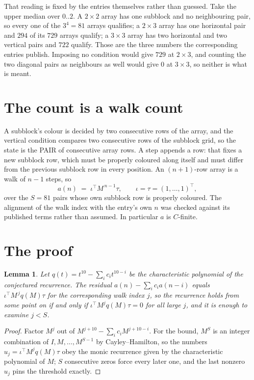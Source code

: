 \documentclass[11pt,a4paper]{article}
\theoremstyle{plain}
\newtheorem{lemma}[theorem]{Lemma}
\theoremstyle{definition}
\begin{document}
That reading is fixed by the entries themselves rather than guessed. Take the upper median
over $0..2$. A $2\times2$ array has one subblock and no neighbouring pair, so every one of the
$3^4=81$ arrays qualifies; a $2\times3$ array has one horizontal pair and $294$ of its $729$
arrays qualify; a $3\times3$ array has two horizontal and two vertical pairs and $722$
qualify. Those are the three numbers the corresponding entries publish. Imposing no condition
would give $729$ at $2\times3$, and counting the two diagonal pairs as neighbours as well
would give $0$ at $3\times3$, so neither is what is meant.

\section{The count is a walk count}

A subblock's colour is decided by two consecutive rows of the array, and
the vertical condition compares two consecutive rows of the subblock grid, so the state is the
PAIR of consecutive array rows. A step appends a row: that fixes a new subblock row, which
must be properly coloured along itself and must differ from the previous subblock row in every
position. An $(n+1)$-row array is a walk of $n-1$ steps, so
\[
a(n)\;=\;\iota^{\!\top}M^{\,n-1}\tau,\qquad\iota=\tau=(1,\dots,1)^{\!\top},
\]
over the $S=81$ pairs whose own subblock row is properly coloured.
The alignment of the walk index with the entry's own $n$ was checked against its published
terms rather than assumed. In particular $a$ is $C$-finite.

\section{The proof}

\begin{lemma}\label{lem:crit}
Let $q(t)=t^{10}-\sum_i c_it^{10-i}$ be the characteristic polynomial of the
conjectured recurrence. The residual $a(n)-\sum_ic_ia(n-i)$ equals
$\iota^{\!\top}M^{\,j}q(M)\tau$ for the corresponding walk index $j$, so the recurrence
holds from some point on if and only if $\iota^{\!\top}M^{j}q(M)\tau=0$ for all large $j$,
and it is enough to examine $j<S$.
\end{lemma}

\begin{proof}
Factor $M^{j}$ out of $M^{j+10}-\sum_ic_iM^{j+10-i}$. For the bound, $M^{S}$
is an integer combination of $I,M,\dots,M^{S-1}$ by Cayley--Hamilton, so the numbers
$u_j=\iota^{\!\top}M^{j}q(M)\tau$ obey the monic recurrence given by the characteristic
polynomial of $M$; $S$ consecutive zeros force every later one, and the last nonzero $u_j$
pins the threshold exactly.
\end{proof}
\end{document}
